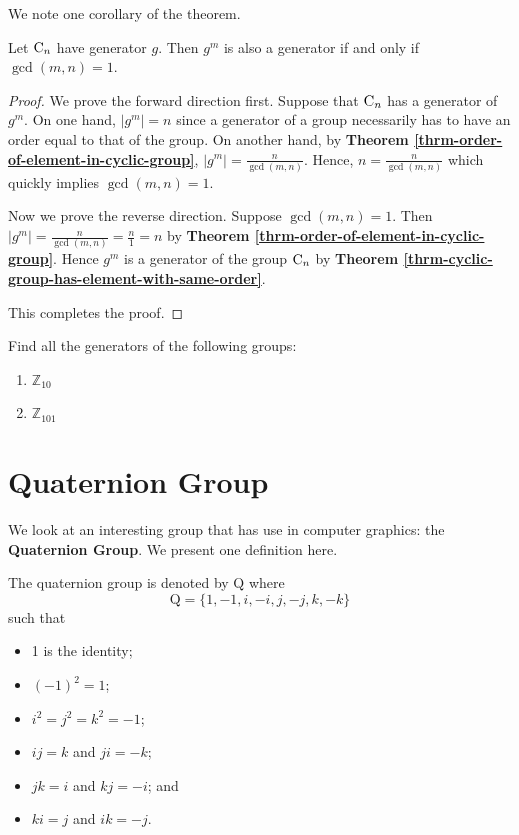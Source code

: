 We note one corollary of the theorem.
\begin{corollary-thrm}
    Let $\mathrm{C}_{n}$ have generator $g$. Then $g^m$ is also a generator if and only if $\gcd(m, n) = 1$.
\end{corollary-thrm}
\begin{proof}
    We prove the forward direction first. Suppose that $\mathrm{C}_{n}$ has a generator of $g^m$. On one hand, $|g^m| = n$ since a generator of a group necessarily has to have an order equal to that of the group. On another hand, by \textbf{Theorem \ref{thrm-order-of-element-in-cyclic-group}}, $|g^m| = \frac{n}{\gcd(m, n)}$. Hence, $n = \frac{n}{\gcd(m, n)}$ which quickly implies $\gcd(m, n) = 1$.

    Now we prove the reverse direction. Suppose $\gcd(m,n) = 1$. Then $|g^m| = \frac{n}{\gcd(m,n)} = \frac{n}{1} = n$ by \textbf{Theorem \ref{thrm-order-of-element-in-cyclic-group}}. Hence $g^m$ is a generator of the group $\mathrm{C}_{n}$ by \textbf{Theorem \ref{thrm-cyclic-group-has-element-with-same-order}}.

    This completes the proof.
\end{proof}

\begin{exercise}
    Find all the generators of the following groups:
    \begin{enumerate}[label=(\alph*)]
        \item $\mathbb{Z}_{10}$
        \item $\mathbb{Z}_{101}$
    \end{enumerate}
\end{exercise}

\newpage

\section{Quaternion Group}
We look at an interesting group that has use in computer graphics: the \textbf{Quaternion Group}. We present one definition here.
\begin{definition}
    The quaternion group is denoted by $\mathrm{Q}$ where
    \[
            \mathrm{Q} = \{1, -1, i, -i, j, -j, k, -k\}
    \]
    such that
    \begin{itemize}
        \item 1 is the identity;
        \item $(-1)^2 = 1$;
        \item $i^2 = j^2 = k^2 = -1$;
        \item $ij = k$ and $ji = -k$;
        \item $jk = i$ and $kj = -i$; and
        \item $ki = j$ and $ik = -j$.
    \end{itemize}
\end{definition}

